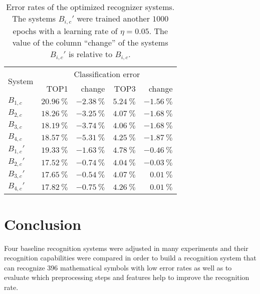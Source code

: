 \documentclass[9pt,technote]{IEEEtran}
\begin{document}
\begin{table}[htb]
    \centering
    \begin{tabular}{lrrrr}
    \toprule
    \multirow{2}{*}{System}  & \multicolumn{4}{c}{Classification error}\\
    \cmidrule(l){2-5}
              & TOP1                   & change                 & TOP3                  & change\\\midrule
    $B_{1,c}$ & $\SI{20.96}{\percent}$ & $\SI{-2.38}{\percent}$ & $\SI{5.24}{\percent}$ & $\SI{-1.56}{\percent}$\\
    $B_{2,c}$ & $\SI{18.26}{\percent}$ & $\SI{-3.25}{\percent}$ & $\SI{4.07}{\percent}$ & $\SI{-1.68}{\percent}$\\
    $B_{3,c}$ & \underline{$\SI{18.19}{\percent}$} & $\SI{-3.74}{\percent}$ & \underline{$\SI{4.06}{\percent}$} & $\SI{-1.68}{\percent}$\\
    $B_{4,c}$ & $\SI{18.57}{\percent}$ & $\SI{-5.31}{\percent}$ & $\SI{4.25}{\percent}$ & $\SI{-1.87}{\percent}$\\\midrule
    $B_{1,c}'$ & $\SI{19.33}{\percent}$ & $\SI{-1.63}{\percent}$ & $\SI{4.78}{\percent}$ & $\SI{-0.46}{\percent}$ \\
    $B_{2,c}'$ & \underline{$\SI{17.52}{\percent}$} & $\SI{-0.74}{\percent}$ & \underline{$\SI{4.04}{\percent}$} & $\SI{-0.03}{\percent}$\\
    $B_{3,c}'$ & $\SI{17.65}{\percent}$ & $\SI{-0.54}{\percent}$ & $\SI{4.07}{\percent}$ & $\SI{+0.01}{\percent}$\\
    $B_{4,c}'$ & $\SI{17.82}{\percent}$ & $\SI{-0.75}{\percent}$ & $\SI{4.26}{\percent}$ & $\SI{+0.01}{\percent}$\\
    \bottomrule
    \end{tabular}
    \caption{Error rates of the optimized recognizer systems. The systems
             $B_{i,c}'$ were trained another $1000$ epochs with a learning rate
             of $\eta=0.05$. The value of the column \enquote{change} of the
             systems $B_{i,c}'$ is relative to $B_{i,c}$.}
\label{table:complex-recognizer-systems-evaluation}
\end{table}


\section{Conclusion}
Four baseline recognition systems were adjusted in many experiments and their
recognition capabilities were compared in order to build a recognition system
that can recognize 396 mathematical symbols with low error rates as well as to
evaluate which preprocessing steps and features help to improve the recognition
rate.
\end{document}

